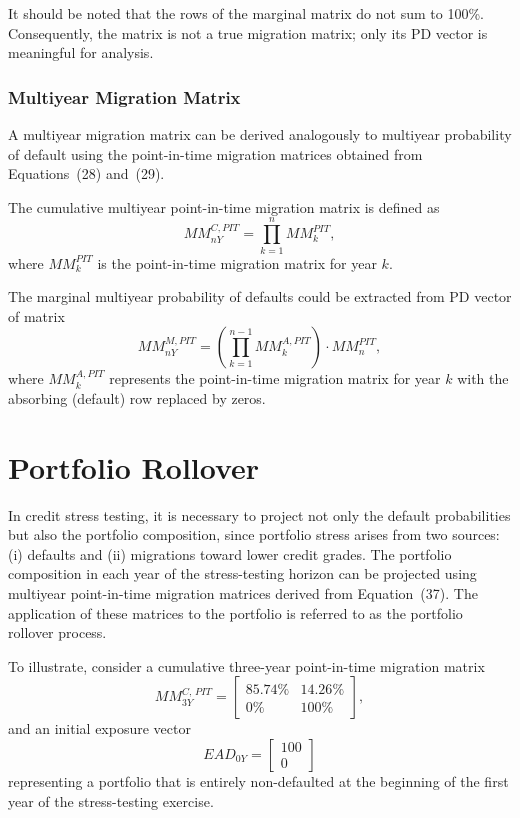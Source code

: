 \documentclass[11pt,a4paper]{article}
\begin{document}
It should be noted that the rows of the marginal matrix do not sum to 100\%. Consequently, the matrix is not a true migration matrix; only its PD vector is meaningful for analysis.

\subsubsection{Multiyear Migration Matrix}

A multiyear migration matrix can be derived analogously to multiyear probability of default using the point-in-time migration matrices obtained from Equations~(28) and~(29).

The cumulative multiyear point-in-time migration matrix is defined as
\begin{equation}
MM_{nY}^{C,PIT} = \prod_{k=1}^{n} MM_k^{PIT},
\end{equation}
where $MM_k^{PIT}$ is the point-in-time migration matrix for year $k$.  

The marginal multiyear probability of defaults could be extracted from PD vector of matrix
\begin{equation}
MM_{nY}^{M,PIT} = \left( \prod_{k=1}^{n-1} MM_k^{A,PIT} \right) \cdot MM_n^{PIT},
\end{equation}
where $MM_k^{A,PIT}$ represents the point-in-time migration matrix for year $k$ with the absorbing (default) row replaced by zeros.

\section{Portfolio Rollover}

In credit stress testing, it is necessary to project not only the default probabilities but also the portfolio composition, since portfolio stress arises from two sources: (i) defaults and (ii) migrations toward lower credit grades. The portfolio composition in each year of the stress-testing horizon can be projected using multiyear point-in-time migration matrices derived from Equation~(37). The application of these matrices to the portfolio is referred to as the portfolio rollover process.

To illustrate, consider a cumulative three-year point-in-time migration matrix
\begin{equation}
MM_{3Y}^{C,\,PIT} =
\begin{bmatrix}
85.74\% & 14.26\% \\
0\% & 100\%
\end{bmatrix},
\end{equation}
and an initial exposure vector
\begin{equation}
EAD_{0Y} =
\begin{bmatrix}
100 \\
0
\end{bmatrix}
\end{equation}
representing a portfolio that is entirely non-defaulted at the beginning of the first year of the stress-testing exercise.
\end{document}
